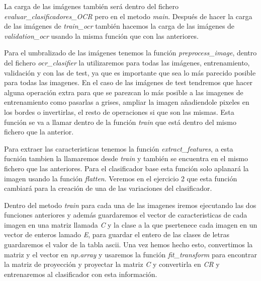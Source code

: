 \documentclass[a4paper, 12pt]{article}
\begin{document}
La carga de las imágenes también será dentro del fichero \textit{evaluar\_clasificadores\_OCR} pero en el metodo \textit{main}. Después de hacer la carga de las imágenes de \textit{train\_ocr} también hacemos la carga de las imágenes de \textit{validation\_ocr} usando la misma función que con las anteriores.  

Para el umbralizado de las imágenes tenemos la función \textit{preprocess\_image}, dentro del fichero \textit{ocr\_clasifier} la utilizaremos para todas las imágenes, entrenamiento, validación y con las de test, ya que es importante que sea lo más parecido posible para todas las imagenes. En el caso de las imágenes de test tendremos que hacer alguna operación extra para que se parezcan lo más posible a las imagenes de entrenamiento como pasarlas a grises, ampliar la imagen añadiendole pixeles en los bordes o invertirlas, el resto de operaciones si que son las mismas. Esta función se va a llamar dentro de la función \textit{train} que está dentro del mismo fichero que la anterior. 

Para extraer las caracteristicas tenemos la función \textit{extract\_features}, a esta fucnión tambien la llamaremos desde \textit{train} y también se encuentra en el mismo fichero que las anteriores. Para el clasificador base esta función solo aplanará la imagen usando la función \textit{flatten}. Veremos en el ejercicio 2 que esta función cambiará para la creación de una de las variaciones del clasificador.

Dentro del metodo \textit{train} para cada una de las imagenes iremos ejecutando las dos funciones anteriores y además guardaremos el vector de caracteristicas de cada imagen en una matriz llamada \textit{C} y la clase a la que psertenece cada imagen en un vector de enteros lamado \textit{E}, para guardar el entero de las clases de letras guardaremos el valor de la tabla ascii. Una vez hemos hecho esto, convertimos la matriz y el vector en \textit{np.array} y usaremos la función \textit{fit\_transform} para encontrar la matriz de proyección y proyectar la matriz \textit{C} y convertirla en \textit{CR} y entrenaremos al clasificador con esta información. 
\end{document}
